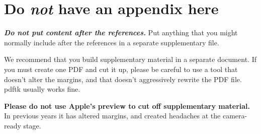 \documentclass{article}
\begin{document}
\nocite{langley00}





\appendix
\section{Do \emph{not} have an appendix here}

\textbf{\emph{Do not put content after the references.}}
%
Put anything that you might normally include after the references in a separate
supplementary file.

We recommend that you build supplementary material in a separate document.
If you must create one PDF and cut it up, please be careful to use a tool that
doesn't alter the margins, and that doesn't aggressively rewrite the PDF file.
pdftk usually works fine. 

\textbf{Please do not use Apple's preview to cut off supplementary material.} In
previous years it has altered margins, and created headaches at the camera-ready
stage. 
\end{document}
